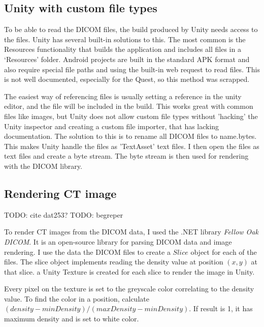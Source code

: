 \documentclass[a4paper]{report}
\begin{document}
\subsection{Unity with custom file types}

To be able to read the DICOM files, the build produced by Unity needs access to the files. Unity has several built-in solutions to this.
The most common is the Resources functionality\cite{resourcesload_unity_nodate} that builds the application and includes all files in a `Resources' folder. Android projects are built in the standard APK format and also require special file paths and using the built-in web request to read files. This is not well documented, especially for the Quest, so this method was scrapped.

The easiest way of referencing files is usually setting a reference in the unity editor, and the file will be included in the build. This works great with common files like images, but Unity does not allow custom file types without 'hacking' the Unity inspector and creating a custom file importer\cite{scriptedimporters_unity_nodate}, that has lacking documentation. The solution to this is to rename all DICOM files to {name}.bytes. This makes Unity handle the files as 'TextAsset' text files\cite{textassets_unity_nodate}. I then open the files as text files and create a byte stream. The byte stream is then used for rendering with the DICOM library.

\subsection{Rendering CT image}
TODO: cite dat253?
TODO: begreper

To render CT images from the DICOM data, I used the .NET library \emph{Fellow Oak DICOM}\cite{noauthor_fellow_2022}. It is an open-source library for parsing DICOM data and image rendering.
I use the data the DICOM files to create a $Slice$ object for each of the files. The slice object implements reading the density value at position $(x, y)$ at that slice. a Unity Texture is created for each slice to render the image in Unity.

Every pixel on the texture is set to the greyscale color correlating to the density value. To find the color in a position, calculate $(density-minDensity)/(maxDensity-minDensity)$. If result is 1, it has maximum density and is set to white color.
\end{document}
